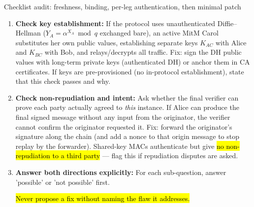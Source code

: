 \documentclass[12pt, a4paper]{article}
\newcommand{\imp}[1]{\hl{#1}}                       %
\begin{document}
\begin{schemebox}{Checklist audit: freshness, binding, per-leg authentication, then minimal patch}
\begin{enumerate}[label=\textbf{Step \arabic*:}, leftmargin=*]
    \item \textbf{Check key establishment:} If the protocol uses unauthenticated Diffie--Hellman ($Y_A = \alpha^{X_A} \bmod q$ exchanged bare), an active MitM Carol substitutes her own public values, establishing separate keys $K_{AC}$ with Alice and $K_{BC}$ with Bob, and relays/decrypts all traffic. Fix: sign the DH public values with long-term private keys (authenticated DH) or anchor them in CA certificates. If keys are pre-provisioned (no in-protocol establishment), state that this check passes and why.
    \item \textbf{Check non-repudiation and intent:} Ask whether the final verifier can prove each party actually agreed to \emph{this} instance. If Alice can produce the final signed message without any input from the originator, the verifier cannot confirm the originator requested it. Fix: forward the originator's signature along the chain (and add a nonce to that origin message to stop replay by the forwarder). Shared-key MACs authenticate but give \imp{no non-repudiation to a third party} --- flag this if repudiation disputes are asked.
    \item \textbf{Answer both directions explicitly:} For each sub-question, answer 'possible' or 'not possible' first.
\imp{Never propose a fix without naming the flaw it addresses.}
\end{enumerate}
\end{schemebox}
\end{document}
